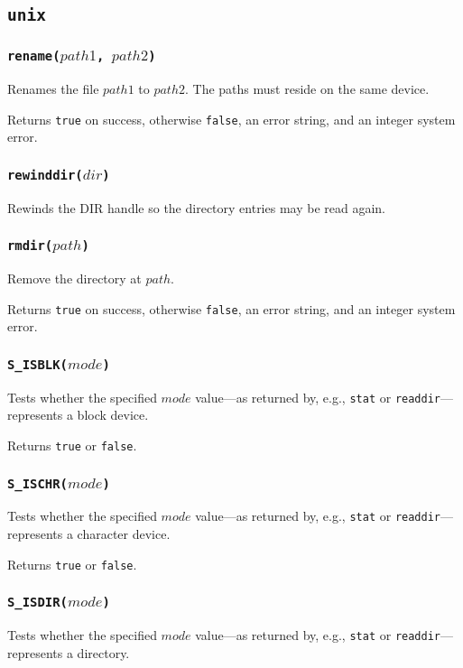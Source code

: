 \documentclass[11pt, oneside]{memoir}
\newcommand*{\true}[0]{\texttt{true}\xspace}
\newcommand*{\false}[0]{\texttt{false}\xspace}
\newcommand*{\syscall}[1]{\texttt{#1}\xspace}
\newcommand*{\fn}[1]{\texttt{#1}\xspace}
\newcounter{toccols}
\newenvironment{Module}[1]{
	\subsection{\texttt{#1}}
	\addtocontents{toc}{
		\protect\begin{multicols}{\value{toccols}}
	}
}{
	\addtocontents{toc}{\protect\end{multicols}}
}
\begin{document}
\begin{Module}{unix}
\subsubsection[\fn{rename}]{\fn{rename($path1$, $path2$)}}

Renames the file $path1$ to $path2$. The paths must reside on the same device.

Returns \true on success, otherwise \false, an error string, and an integer system error.

\subsubsection[\fn{rewinddir}]{\fn{rewinddir($dir$)}}

Rewinds the DIR handle so the directory entries may be read again.

\subsubsection[\fn{rmdir}]{\fn{rmdir($path$)}}

Remove the directory at $path$.

Returns \true on success, otherwise \false, an error string, and an integer system error.

\subsubsection[\fn{S\_ISBLK}]{\fn{S\_ISBLK($mode$)}}

Tests whether the specified $mode$ value---as returned by, e.g., \syscall{stat} or \syscall{readdir}---represents a block device.

Returns \true or \false.

\subsubsection[\fn{S\_ISCHR}]{\fn{S\_ISCHR($mode$)}}

Tests whether the specified $mode$ value---as returned by, e.g., \syscall{stat} or \syscall{readdir}---represents a character device.

Returns \true or \false.

\subsubsection[\fn{S\_ISDIR}]{\fn{S\_ISDIR($mode$)}}

Tests whether the specified $mode$ value---as returned by, e.g., \syscall{stat} or \syscall{readdir}---represents a directory.


\end{Module}
\end{document}
